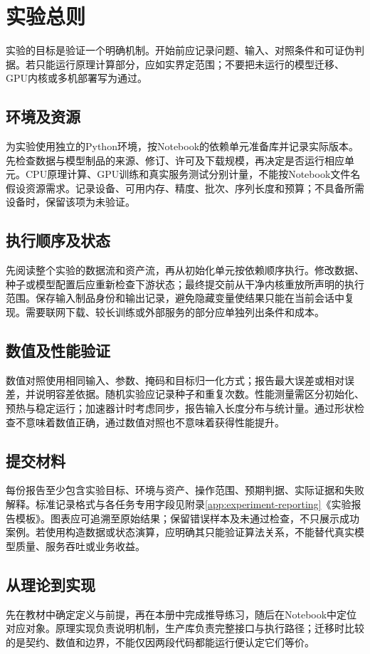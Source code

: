 \chapter*{实验总则}

实验的目标是验证一个明确机制。开始前应记录问题、输入、对照条件和可证伪判据。若只能运行原理计算部分，应如实界定范围；不要把未运行的模型迁移、GPU内核或多机部署写为通过。

\section*{环境及资源}
为实验使用独立的Python环境，按Notebook的依赖单元准备库并记录实际版本。先检查数据与模型制品的来源、修订、许可及下载规模，再决定是否运行相应单元。CPU原理计算、GPU训练和真实服务测试分别计量，不能按Notebook文件名假设资源需求。记录设备、可用内存、精度、批次、序列长度和预算；不具备所需设备时，保留该项为未验证。

\section*{执行顺序及状态}
先阅读整个实验的数据流和资产流，再从初始化单元按依赖顺序执行。修改数据、种子或模型配置后应重新检查下游状态；最终提交前从干净内核重放所声明的执行范围。保存输入制品身份和输出记录，避免隐藏变量使结果只能在当前会话中复现。需要联网下载、较长训练或外部服务的部分应单独列出条件和成本。

\section*{数值及性能验证}
数值对照使用相同输入、参数、掩码和目标归一化方式；报告最大误差或相对误差，并说明容差依据。随机实验应记录种子和重复次数。性能测量需区分初始化、预热与稳定运行；加速器计时考虑同步，报告输入长度分布与统计量。通过形状检查不意味着数值正确，通过数值对照也不意味着获得性能提升。

\section*{提交材料}
每份报告至少包含实验目标、环境与资产、操作范围、预期判据、实际证据和失败解释。标准记录格式与各任务专用字段见附录\ref{app:experiment-reporting}《实验报告模板》。图表应可追溯至原始结果；保留错误样本及未通过检查，不只展示成功案例。若使用构造数据或状态演算，应明确其只能验证算法关系，不能替代真实模型质量、服务吞吐或业务收益。

\section*{从理论到实现}
先在教材中确定定义与前提，再在本册中完成推导练习，随后在Notebook中定位对应对象。原理实现负责说明机制，生产库负责完整接口与执行路径；迁移时比较的是契约、数值和边界，不能仅因两段代码都能运行便认定它们等价。


